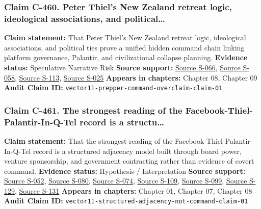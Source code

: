 \documentclass[
  american,
  11pt,
  letterpaper,
]{article}
\begin{document}
\subsubsection{Claim C-460. Peter Thiel's New Zealand retreat logic,
ideological associations, and
political\ldots{}}\label{claim-c-460-peter-thiel-s-new-zealand-retreat-logic-ideological-associations-and-political}

\textbf{Claim statement:} That Peter Thiel's New Zealand retreat logic,
ideological associations, and political ties prove a unified hidden
command chain linking platform governance, Palantir, and civilizational
collapse planning. \textbf{Evidence status:} Speculative Narrative Risk
\textbf{Source support:}
\hyperref[source-s-066-why-silicon-valley-billionaires-are-prepping-for-the-apocalypse-in-new-zealand]{Source
S-066},
\hyperref[source-s-058-new-zealand-woos-the-wealthy-with-golden-visa-changes]{Source
S-058},
\hyperref[source-s-113-the-sovereign-individual-official-publisher-page]{Source
S-113},
\hyperref[source-s-025-thiel-brings-his-antichrist-lectures-to-the-vaticans-doorstep-and-catholic-institutions-back-away]{Source
S-025} \textbf{Appears in chapters:} Chapter 08, Chapter 09
\textbf{Audit Claim ID:}
\texttt{vector11-prepper-command-overclaim-claim-01}

\subsubsection{Claim C-461. The strongest reading of the
Facebook-Thiel-Palantir-In-Q-Tel record is a
structu\ldots{}}\label{claim-c-461-the-strongest-reading-of-the-facebook-thiel-palantir-in-q-tel-record-is-a-structu}

\textbf{Claim statement:} That the strongest reading of the
Facebook-Thiel-Palantir-In-Q-Tel record is a structured adjacency model
built through board power, venture sponsorship, and government
contracting rather than evidence of covert command. \textbf{Evidence
status:} Hypothesis / Interpretation \textbf{Source support:}
\hyperref[source-s-052-facebook-inc-registration-statement-on-form-s-1]{Source
S-052},
\hyperref[source-s-080-meta-platforms-inc-2022-definitive-proxy-statement]{Source
S-080}, \hyperref[source-s-074-in-q-tel]{Source S-074},
\hyperref[source-s-109-in-q-tel-the-central-intelligence-agency-as-venture-capitalist]{Source
S-109}, \hyperref[source-s-099-gotham]{Source S-099},
\hyperref[source-s-129-what-to-know-about-palantir-the-tech-company-playing-a-key-role-for-ice]{Source
S-129}, \hyperref[source-s-131-it-pays-to-play-with-the-cia]{Source
S-131} \textbf{Appears in chapters:} Chapter 01, Chapter 07, Chapter 08
\textbf{Audit Claim ID:}
\texttt{vector11-structured-adjacency-not-command-claim-01}
\end{document}
